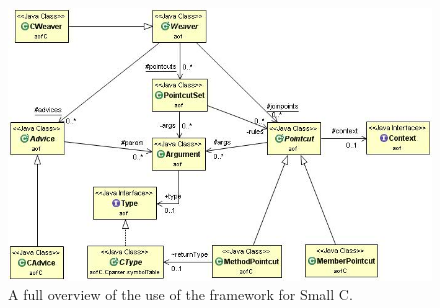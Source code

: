 \documentclass[a4paper]{report}
\begin{document}
\begin{figure}
\centering
\includegraphics[scale=0.55]{images/AOFC/CFull.jpg}
\caption{A full overview of the use of the framework for Small C.}
\label{fig:CFull}
\end{figure}
\end{document}
